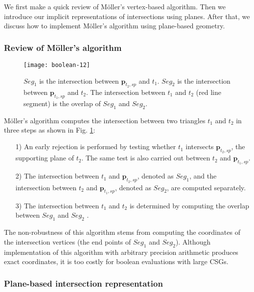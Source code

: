 We first make a quick review of M\"{o}ller's vertex-based algorithm. Then we introduce our implicit representations of intersections using planes. After that, we discuss how to implement M\"{o}ller's algorithm using plane-based geometry.

\subsubsection{Review of M\"{o}ller's algorithm}


\begin{figure}[t]
\centering
\texttt{[image: boolean-12]}
\caption{$Seg_1$ is the intersection between $\bm{p}_{t_2, sp}$ and $t_1$. $Seg_2$ is the intersection between $\bm{p}_{t_1, sp}$ and $t_2$. The intersection between $t_1$ and $t_2$ (red line segment) is the overlap of $Seg_1$ and $Seg_2$.}
\label{fig_projection}
\end{figure}


M\"{o}ller's algorithm computes the intersection between two triangles $t_1$ and $t_2$ in three steps as shown in Fig. \ref{fig_projection}:
\begin{itemize}[leftmargin=0.45cm]
\item[1)] An early rejection is performed by testing whether $t_1$ intersects $\bm{p}_{t_2, sp}$, the supporting plane of $t_2$. The same test is also carried out between $t_2$ and $\bm{p}_{t_1, sp}$.
\item[2)]The intersection between $t_1$ and $\bm{p}_{t_2, sp}$, denoted as $Seg_1$, and the intersection between $t_2$ and $\bm{p}_{t_1, sp}$, denoted as $Seg_2$, are computed separately.
 \item[3)]The intersection between $t_1$ and $t_2$ is determined by computing the overlap between $Seg_1$ and $Seg_2$ .
\end{itemize}



The non-robustness of this algorithm stems from computing the coordinates of the intersection vertices (the end points of $Seg_1$ and $Seg_2$). Although implementation of this algorithm with arbitrary precision arithmetic produces exact coordinates, it is too costly for boolean evaluations with large CSGs.

\subsubsection{Plane-based intersection representation}
\label{sec:ir}

